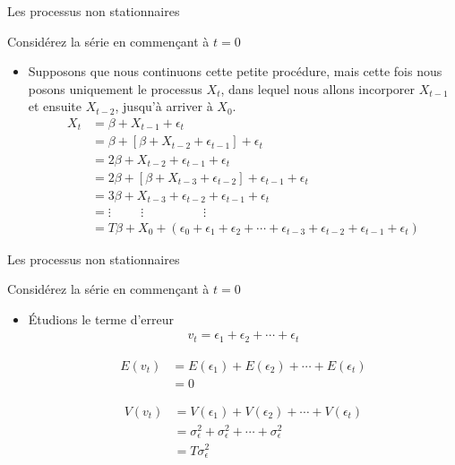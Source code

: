 \documentclass{beamer}
\begin{document}
\begin{frame}{Les processus non stationnaires}
\begin{block}{Considérez la série en commençant à $t=0$}
\begin{itemize}

\item Supposons que nous continuons cette petite procédure, mais cette fois nous posons uniquement le processus $X_t$, dans lequel nous allons incorporer $X_{t-1}$ et ensuite $X_{t-2}$, jusqu'à arriver à $X_0$.
\begin{align*}
X_t & =\beta + X_{t-1}+\epsilon_t \\ 
& = \beta + [\beta + X_{t-2}+\epsilon_{t-1} ] +\epsilon_t \\
& = 2 \beta + X_{t-2} +\epsilon_{t-1} +\epsilon_t \\
& = 2 \beta + [\beta + X_{t-3}+\epsilon_{t-2} ] +\epsilon_{t-1} +\epsilon_t \\
& = 3 \beta + X_{t-3}+\epsilon_{t-2} + \epsilon_{t-1} + \epsilon_t \\
& =  \vdots \hspace{1cm} \vdots \hspace{2cm} \vdots \\
& = T \beta + X_0 + (\epsilon_0+ \epsilon_1 + \epsilon_2+\cdots +\epsilon_{t-3}+\epsilon_{t-2}+\epsilon_{t-1}+\epsilon_{t})
\end{align*}
\end{itemize}
\end{block}
\end{frame}

\begin{frame}{Les processus non stationnaires}
\begin{block}{Considérez la série en commençant à $t=0$}
\begin{itemize}
\item Étudions le terme d’erreur
\begin{align*}
v_t=\epsilon_1+\epsilon_2+\cdots+\epsilon_t
\end{align*}

\begin{align*}
E(v_t) & =E(\epsilon_1)+E(\epsilon_2)+\cdots+E(\epsilon_t) \\ 
& =0
\end{align*}

\begin{align*}
V(v_t) & =V(\epsilon_1)+V(\epsilon_2)+\cdots+V(\epsilon_t)\\ 
& =\sigma_{\epsilon}^2+\sigma_{\epsilon}^2+\cdots+\sigma_{\epsilon}^2\\
& =T\sigma_{\epsilon}^2
\end{align*}

\end{itemize}
\end{block}
\end{frame}
\end{document}
